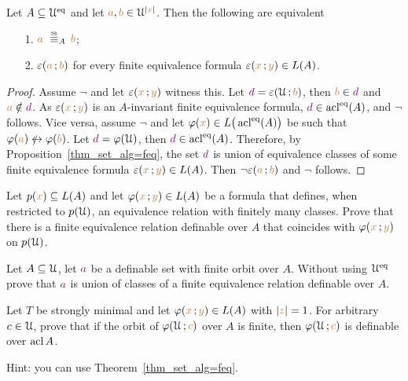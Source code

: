 \documentclass[creche.tex]{subfiles}
\begin{document}
\begin{proposition}
Let $A\subseteq\EuScript U^{{\rm eq}}$ and let ${\color{brown} a},{\color{brown} b}\in\EuScript U^{|{\color{brown} x}|}$. Then the following are equivalent
\begin{itemize}
\item[1.]  ${\mr a}\ \equivSh_A\, {\mr b}$;
\item[2.]  $\varepsilon({\color{brown} a}\,;{\color{brown} b})$ for every finite equivalence formula $\varepsilon({\color{brown} x}\,;{\color{brown} y})\in L(A)$.
\end{itemize} 
\end{proposition}
\begin{proof}
Assume $\neg$ and let $\varepsilon({\color{brown} x}\,;{\color{brown} y})$ witness this. Let ${\color{violet} d}=\varepsilon(\EuScript U\,;{\color{brown} b})$, then  ${\color{brown} b}\in{\color{violet}d}$ and ${\color{brown} a}\notin{\color{violet}d}$. As $\varepsilon({\color{brown} x}\,;{\color{brown} y})$ is an $A$-invariant finite equivalence formula, ${\color{violet} d}\in\mathop{\rm acl}^{{\rm eq}}(A)$, and $\neg$ follows. Vice versa, assume $\neg$ and let $\varphi({\color{brown} x})\in L\big(\mathop{\rm acl}^{{\rm eq}}(A)\big)$ be  such that $\phi({\mr a})\niff\phi({\mr b})$. Let ${\color{violet} d}=\varphi(\EuScript U)$, then ${\color{violet} d}\in\mathop{\rm acl}^{{\rm eq}}(A)$. Therefore, by Proposition~\ref{thm_set_alg=feq}, the set ${\color{violet} d}$ is union of equivalence classes of some finite equivalence formula $\varepsilon({\color{brown} x}\,;{\color{brown} y})\in L(A)$. Then $\neg\varepsilon({\color{brown} a}\,;{\color{brown} b})$ and $\neg$ follows.
\end{proof}

\begin{exercise}
Let $p({\color{brown} x})\subseteq L(A)$ and let $\varphi({\color{brown} x}\,;{\color{brown} y})\in L(A)$ be a formula that defines, when restricted to $p(\EuScript U)$, an equivalence relation with finitely many classes. Prove that there is a finite equivalence relation definable over $A$ that coincides with $\varphi({\color{brown} x}\,;{\color{brown} y})$ on $p(\EuScript U)$.\QED
\end{exercise}

\begin{exercise}\label{ex_feqthm_senza_eq}
Let $A\subseteq\EuScript U$, let ${\color{violet} a}$ be a definable set with finite orbit over $A$. Without using $\EuScript U^{{\rm eq}}$ prove that ${\color{violet} a}$ is union of classes of a finite equivalence relation definable over $A$.\QED
\end{exercise}

\begin{exercise}
Let $T$ be strongly minimal and let $\varphi({\color{brown} x}\,;{\color{brown} y})\in L(A)$ with $|{\color{brown} z}|=1$. For arbitrary $c\in\EuScript U$, prove that if the orbit of $\varphi(\EuScript U\,; {\color{brown} c})$ over $A$ is finite, then $\varphi(\EuScript U\,; {\color{brown} c})$ is definable over $\mathop{\rm acl} A$. 

Hint: you can use Theorem~\ref{thm_set_alg=feq}.\QED
\end{exercise}
\end{document}
